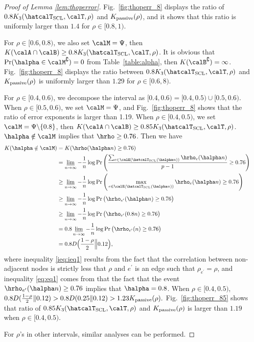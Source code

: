 \documentclass[11pt,onecolumn]{article}
\newcommand{\Passive}{{\rm passive}}
\begin{document}
\begin{proof}[Proof of Lemma \ref{lem:thoperror}]
	Fig.~\ref{fig:thoperr_8} displays the ratio of $0.8K _{3}(\hatcalT_{{\rm SCL}},\calT,\rho)$ and $K _{\Passive}(\rho)$, and it shows that this ratio is uniformly larger than $1.4$ for $\rho\in[0.8,1)$.

	For $\rho\in[0.6,0.8)$, we also set $\calM=\Psi$, then $K ( \calA\cap \calB)\geq 0.8K _{3}(\hatcalT_{{\rm SCL}},\calT,\rho)$. It is obvious that $\Pr(\halpha\in \calM^{\complement})=0$ from Table~\ref{table:alpha}, 
	then $K (\calB^{\complement})=\infty$. Fig.~\ref{fig:thoperr_8} displays the ratio between $0.8K _{3}(\hatcalT_{{\rm SCL}},\calT,\rho)$ and $K _{\Passive}(\rho)$ is  uniformly larger than $1.29$ for $\rho\in[0.6,8)$.
	
	For $\rho\in[0.4,0.6)$, we decompose the interval as $[0.4,0.6)=[0.4,0.5)\cup [0.5,0.6)$. When $\rho\in[0.5,0.6)$, we set $\calM=\Psi$, and Fig.~\ref{fig:thoperr_8} 
	shows that the ratio of error exponents is larger than 1.19. When $\rho\in[0.4,0.5)$, we set $\calM=\Psi\backslash\{0.8\}$, then $K ( \calA\cap \calB)\geq 0.85K _{3}(\hatcalT_{{\rm SCL}},\calT,\rho)$. $\halpha\notin \calM$ implies that $\hrho \geq 0.76$. Then we have
	\begin{align}
		K (\halpha\notin \calM)&=K (\hrho(\halpha n)\geq 0.76)\\*
		&=\varliminf_{n\rightarrow \infty}-\frac{1}{n}\log\Pr\Bigg(\frac{\sum_{e\in\calE (\hatcalT_{{\rm SCL}}(\halpha n) )}\hrho_{e}(\halpha n)}{p-1}\geq 0.76\Bigg)\\
		&\geq\varliminf_{n\rightarrow \infty}-\frac{1}{n}\log\Pr\Bigg(\max_{e\in\calE (\hatcalT_{{\rm SCL}}(\halpha n) )}\hrho_{e}(\halpha n)\geq 0.76\Bigg)\\
		&\geq \varliminf_{n\rightarrow \infty}-\frac{1}{n}\log\Pr\big(\hrho_{e^{\prime}}(\halpha n)\geq 0.76\big) \label{ieq:ieq1}\\
		&\geq \varliminf_{n\rightarrow \infty}-\frac{1}{n}\log\Pr\big(\hrho_{e^{\prime}}(0.8n)\geq 0.76\big) \label{eq:eq1}\\
		&= 0.8\varliminf_{n\rightarrow \infty}-\frac{1}{n}\log\Pr\big(\hrho_{e^{\prime}}(n)\geq 0.76\big)\\
		&= 0.8D\Big(\frac{1-\rho}{2}\Big\|0.12\Big),
	\end{align}
	where inequality \eqref{ieq:ieq1} results from the fact that the correlation between non-adjacent nodes is strictly less that $\rho$ and $e^{\prime}$ is an edge such that $\rho_{e^{\prime}}=\rho$, and inequality \eqref{eq:eq1} comes from that the fact that the event $\hrho_{e^{\prime}}(\halpha n)\geq 0.76$ implies that $\halpha=0.8$. When $\rho\in[0.4,0.5)$, $0.8D(\frac{1-\rho}{2}\|0.12)>0.8D(0.25\|0.12)>1.23K _{\Passive}(\rho).$
	Fig.~\ref{fig:thoperr_85} shows that ratio of $0.85K _{3}(\hatcalT_{{\rm SCL}},\calT,\rho)$ and $K _{\Passive}(\rho)$ is larger than $1.19$ when $\rho\in[0.4,0.5)$.

	For $\rho$'s in other intervals, similar analyses can be performed.
\end{proof}
\end{document}
